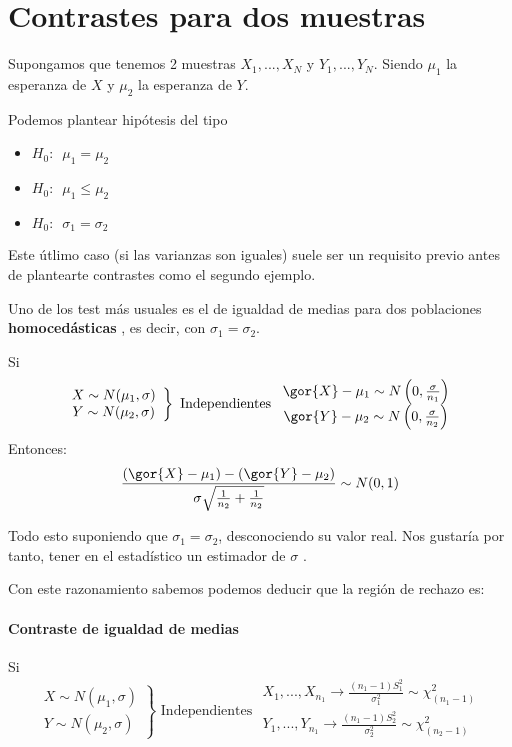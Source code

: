 \documentclass{apuntes}
\begin{document}
\section{Contrastes para dos muestras}

Supongamos que tenemos 2 muestras $X_1,...,X_N$ y $Y_1,...,Y_N$. Siendo $\mu_1$ la esperanza de $X$ y $\mu_2$ la esperanza de $Y$.

Podemos plantear hipótesis del tipo
\begin{itemize}
\item $H_0: \,\,\, \mu_1=\mu_2$
\item $H_0: \,\,\, \mu_1\leq\mu_2$
\item $H_0: \,\,\, \sigma_1 = \sigma_2$
\end{itemize}
Este útlimo caso (si las varianzas son iguales) suele ser un requisito previo antes de plantearte contrastes como el segundo ejemplo.


Uno de los test más usuales es el de igualdad de medias para dos poblaciones \textbf{homocedásticas} , es decir, con $\sigma_1=\sigma_2$.

Si \[\left.\begin{array}{cc}
X\sim N(\mu_1,\sigma)\\
Y\sim N(\mu_2,\sigma)
\end{array}\right\}\text{ Independientes } \begin{array}{cc}
\gor{X} -\mu_1 \sim N\left(0,\frac{\sigma}{n_1}\right)\\
\gor{Y} - \mu_2 \sim N\left(0,\frac{\sigma}{n_2}\right)
\end{array}\]
Entonces:
\[\frac{(\gor{X}-\mu_1) - (\gor{Y} - \mu_2)}{\sigma\sqrt{\frac{1}{n_2} + \frac{1}{n_2}}}\sim N(0,1)\]

Todo esto suponiendo que $\sigma_1=\sigma_2$, desconociendo su valor real. Nos gustaría por tanto, tener en el estadístico un estimador de $\sigma$ .

Con este razonamiento sabemos podemos deducir que la región de rechazo es:


\paragraph{Contraste de igualdad de medias}
Si \[\left.\begin{array}{cc}
X\sim N(\mu_1,\sigma)\\
Y\sim N(\mu_2,\sigma)
\end{array}\right\}\text{ Independientes } \begin{array}{c}
X_1,...,X_{n_1}\to \frac{(n_1-1)S_1^2}{\sigma_1^2} \sim \chi^2_{(n_1-1)}\\
Y_1,...,Y_{n_1}\to \frac{(n_1-1)S_2^2}{\sigma_2^2} \sim \chi^2_{(n_2-1)}\\
\end{array}\]
\end{document}
